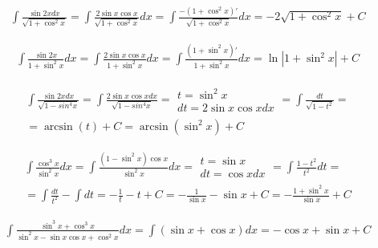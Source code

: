 
\begin{gather*}\int \frac{\sin 2x dx}{\sqrt{1+\cos^2 x}} = \int \frac{2\sin x \cos x}{\sqrt{1+\cos^2 x}}dx = \int \frac{-(1+\cos^2 x)'}{\sqrt{1+\cos^2 x}}dx = -2\sqrt{1+\cos^2x}+C \end{gather*}



\begin{gather*}\int \frac{\sin 2x}{1+\sin^2 x}dx = \int \frac{2\sin x\cos x}{1+\sin^2 x}dx = \int \frac{(1+\sin^2x)'}{1+\sin^2x}dx = \ln|1+\sin^2 x|+C\end{gather*}



\begin{gather*}\int \frac{\sin 2x dx}{\sqrt{1-sin^4 x}} = \int \frac{2\sin x \cos x dx}{\sqrt{1-sin^4 x}} = \begin{array}{|l|} t=\sin^2 x \\ dt=2\sin x\cos xdx \end{array} = \int \frac{dt}{\sqrt{1-t^2}} =  \\
= \arcsin (t)+C = \arcsin (\sin^2 x)+C\end{gather*}



\begin{gather*}\int \frac{\cos^3 x}{\sin^2 x}dx = \int \frac{(1-\sin^2 x)\cos x}{\sin^2 x}dx = \begin{array}{|l|} t=\sin x \\ dt=\cos x dx \end{array} = \int \frac{1-t^2}{t^2}dt =  \\
= \int \frac{dt}{t^2} - \int dt = -\frac{1}{t}-t +C = -\frac{1}{\sin x}-\sin x+C = -\frac{1+\sin^2x}{\sin x}+C\end{gather*}



\begin{gather*}\int \frac{\sin^3 x+\cos^3 x}{\sin^2 x - \sin x \cos x + \cos^2 x}dx = \int (\sin x+\cos x)dx = -\cos x+\sin x+C\end{gather*}



